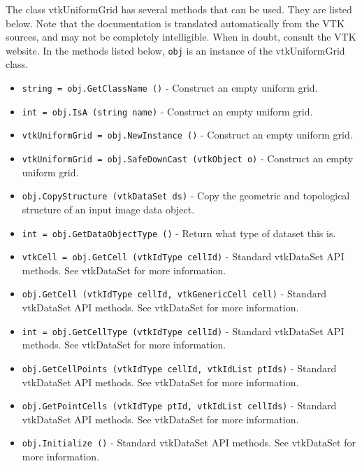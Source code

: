 The class vtkUniformGrid has several methods that can be used.
  They are listed below.
Note that the documentation is translated automatically from the VTK sources,
and may not be completely intelligible.  When in doubt, consult the VTK website.
In the methods listed below, \verb|obj| is an instance of the vtkUniformGrid class.
\begin{itemize}
\item  \verb|string = obj.GetClassName ()| -  Construct an empty uniform grid.

\item  \verb|int = obj.IsA (string name)| -  Construct an empty uniform grid.

\item  \verb|vtkUniformGrid = obj.NewInstance ()| -  Construct an empty uniform grid.

\item  \verb|vtkUniformGrid = obj.SafeDownCast (vtkObject o)| -  Construct an empty uniform grid.

\item  \verb|obj.CopyStructure (vtkDataSet ds)| -  Copy the geometric and topological structure of an input image data
 object.

\item  \verb|int = obj.GetDataObjectType ()| -  Return what type of dataset this is.

\item  \verb|vtkCell = obj.GetCell (vtkIdType cellId)| -  Standard vtkDataSet API methods. See vtkDataSet for more information.

\item  \verb|obj.GetCell (vtkIdType cellId, vtkGenericCell cell)| -  Standard vtkDataSet API methods. See vtkDataSet for more information.

\item  \verb|int = obj.GetCellType (vtkIdType cellId)| -  Standard vtkDataSet API methods. See vtkDataSet for more information.

\item  \verb|obj.GetCellPoints (vtkIdType cellId, vtkIdList ptIds)| -  Standard vtkDataSet API methods. See vtkDataSet for more information.

\item  \verb|obj.GetPointCells (vtkIdType ptId, vtkIdList cellIds)| -  Standard vtkDataSet API methods. See vtkDataSet for more information.

\item  \verb|obj.Initialize ()| -  Standard vtkDataSet API methods. See vtkDataSet for more information.


\end{itemize}
